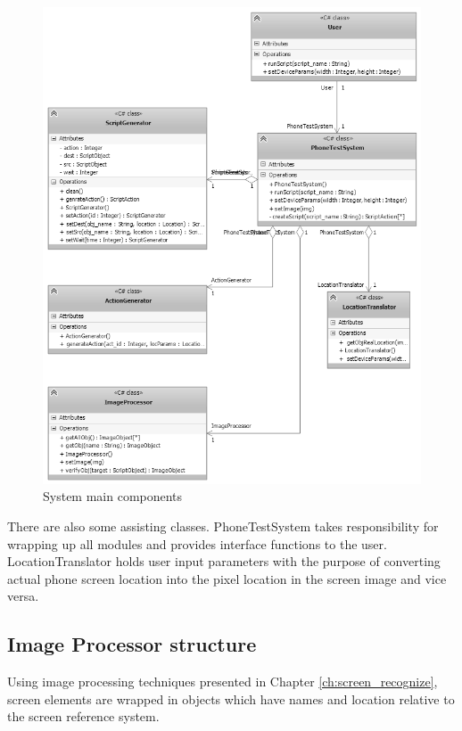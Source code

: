 	\begin{figure}[H]
		\centering
		\includegraphics[scale=0.75]{Chapters/Fig/main_class.png}
		\caption{System main components}
		\label{fig:main_class}
	\end{figure}

There are also some assisting classes. PhoneTestSystem takes responsibility for wrapping up all modules and provides interface functions to the user. LocationTranslator holds user input parameters with the purpose of converting actual phone screen location into the pixel location in the screen image and vice versa.

\subsection{Image Processor structure}
Using image processing techniques presented in Chapter \ref{ch:screen_recognize}, screen elements are wrapped in objects which have names and location relative to the screen reference system.

